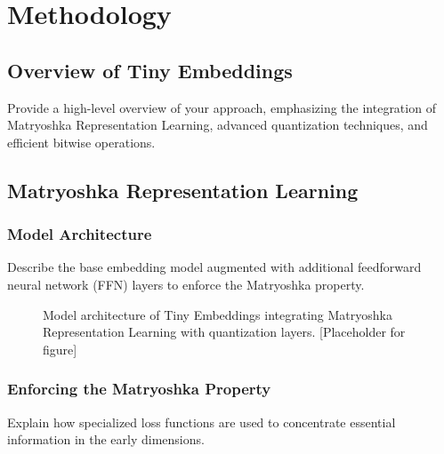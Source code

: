 \section{Methodology}  
\label{sec:methodology}  


  
\subsection{Overview of Tiny Embeddings}  
Provide a high-level overview of your approach, emphasizing the integration of Matryoshka Representation Learning, advanced quantization techniques, and efficient bitwise operations.  
  
\subsection{Matryoshka Representation Learning}  
\label{sec:matryoshka}  
  
\subsubsection{Model Architecture}  
Describe the base embedding model augmented with additional feedforward neural network (FFN) layers to enforce the Matryoshka property.  
  
\begin{figure}[ht]  
    \centering  
    \caption{Model architecture of Tiny Embeddings integrating Matryoshka Representation Learning with quantization layers. [Placeholder for figure]}  
    \label{fig:model_architecture}  
\end{figure}  
  
\subsubsection{Enforcing the Matryoshka Property}  
Explain how specialized loss functions are used to concentrate essential information in the early dimensions.  
  
